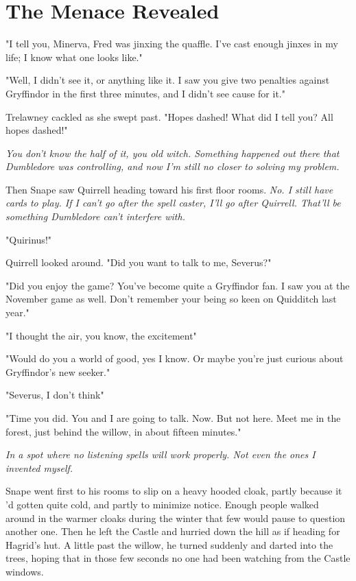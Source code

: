 
\chapter{The Menace Revealed}

"I tell you, Minerva, Fred was jinxing the quaffle. I've cast enough jinxes in my life; I know what one looks like."

"Well, I didn't see it, or anything like it. I saw you give two penalties against Gryffindor in the first three minutes, and I didn't see cause for it."

Trelawney cackled as she swept past. "Hopes dashed! What did I tell you? All hopes dashed!"

\emph{You don't know the half of it, you old witch. Something happened out there that Dumbledore was controlling, and now I'm still no closer to solving my problem.}

Then Snape saw Quirrell heading toward his first floor rooms. \emph{No. I still have cards to play. If I can't go after the spell caster, I'll go after Quirrell. That'll be something Dumbledore can't interfere with.}

"Quirinus!"

Quirrell looked around. "Did you{\el} want to talk to{\el} me, Severus?"

"Did you enjoy the game? You've become quite a Gryffindor fan. I saw you at the November game as well. Don't remember your being so keen on Quidditch last year."

"I{\el} thought the air, you{\el} know, the excitement{\el}"

"Would do you a world of good, yes I know. Or maybe you're just curious about Gryffindor's new seeker."

"Severus, I don't think{\el}"

"Time you did. You and I are going to talk. Now. But not here. Meet me in the forest, just behind the willow, in about fifteen minutes."

\emph{In a spot where no listening spells will work properly. Not even the ones I invented myself.}

Snape went first to his rooms to slip on a heavy hooded cloak, partly because it 'd gotten quite cold, and partly to minimize notice. Enough people walked around in the warmer cloaks during the winter that few would pause to question another one. Then he left the Castle and hurried down the hill as if heading for Hagrid's hut. A little past the willow, he turned suddenly and darted into the trees, hoping that in those few seconds no one had been watching from the Castle windows.

